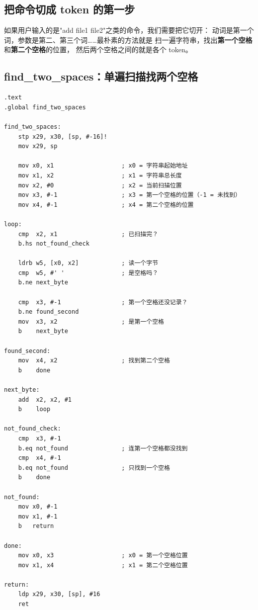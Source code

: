 \subsection{把命令切成 token 的第一步}

如果用户输入的是"add file1 file2"之类的命令，我们需要把它切开：
动词是第一个词，参数是第二、第三个词……最朴素的方法就是
扫一遍字符串，找出\textbf{第一个空格}和\textbf{第二个空格}的位置，
然后两个空格之间的就是各个 token。

\subsection{find\_two\_spaces：单遍扫描找两个空格}

\begin{lstlisting}[style=asm,caption=str\_parse\_cmd.s — find\_two\_spaces]
.text
.global find_two_spaces

find_two_spaces:
    stp x29, x30, [sp, #-16]!
    mov x29, sp

    mov x0, x1                   ; x0 = 字符串起始地址
    mov x1, x2                   ; x1 = 字符串总长度
    mov x2, #0                   ; x2 = 当前扫描位置
    mov x3, #-1                  ; x3 = 第一个空格的位置（-1 = 未找到）
    mov x4, #-1                  ; x4 = 第二个空格的位置

loop:
    cmp  x2, x1                  ; 已扫描完？
    b.hs not_found_check

    ldrb w5, [x0, x2]            ; 读一个字节
    cmp  w5, #' '                ; 是空格吗？
    b.ne next_byte

    cmp  x3, #-1                 ; 第一个空格还没记录？
    b.ne found_second
    mov  x3, x2                  ; 是第一个空格
    b    next_byte

found_second:
    mov  x4, x2                  ; 找到第二个空格
    b    done

next_byte:
    add  x2, x2, #1
    b    loop

not_found_check:
    cmp  x3, #-1
    b.eq not_found               ; 连第一个空格都没找到
    cmp  x4, #-1
    b.eq not_found               ; 只找到一个空格
    b    done

not_found:
    mov x0, #-1
    mov x1, #-1
    b   return

done:
    mov x0, x3                   ; x0 = 第一个空格位置
    mov x1, x4                   ; x1 = 第二个空格位置

return:
    ldp x29, x30, [sp], #16
    ret
\end{lstlisting}

